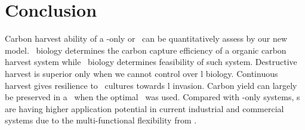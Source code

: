 \documentclass[../thesis.tex]{subfiles} %
\begin{document}
\section{Conclusion}
Carbon harvest ability of a \phy-only or \pbs\ can be quantitatively assess by our new model.  \Phy\ biology determines the carbon capture efficiency of a organic carbon harvest system while \bac\ biology determines feasibility of such system.  Destructive harvest is superior only when we cannot control over \bac l biology.  Continuous harvest gives resilience to \phy\ cultures towards \bac l invasion.  Carbon yield can largely be preserved in a \pbs\ when the optimal \bac\ was used.  Compared with \phy-only systems, \pbs s are having higher application potential in current industrial and commercial systems due to the multi-functional flexibility from \bac.
\end{document}
